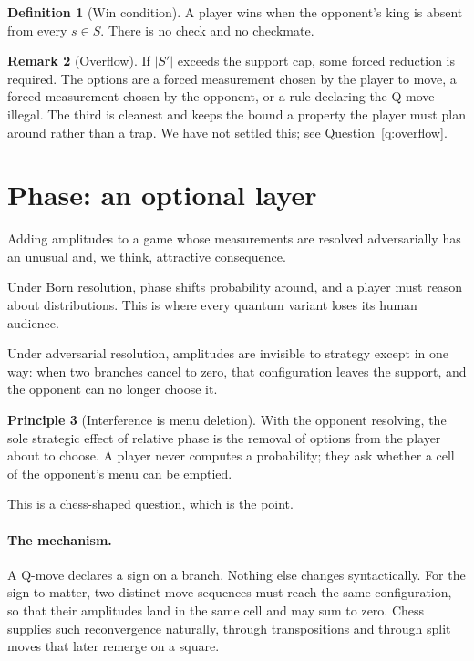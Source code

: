 \documentclass[11pt,a4paper]{article}
\theoremstyle{definition}
\newtheorem{definition}{Definition}[section]
\newtheorem{principle}[definition]{Principle}
\newtheorem{remark}[definition]{Remark}
\theoremstyle{plain}
\begin{document}
\begin{definition}[Win condition]
A player wins when the opponent's king is absent from every $s\in S$. There is
no check and no checkmate.
\end{definition}

\begin{remark}[Overflow]
If $|S'|$ exceeds the support cap, some forced reduction is required. The
options are a forced measurement chosen by the player to move, a forced
measurement chosen by the opponent, or a rule declaring the Q-move illegal.
The third is cleanest and keeps the bound a property the player must plan
around rather than a trap. We have not settled this; see
Question~\ref{q:overflow}.
\end{remark}

\section{Phase: an optional layer}
\label{sec:phase}

Adding amplitudes to a game whose measurements are resolved adversarially has
an unusual and, we think, attractive consequence.

Under Born resolution, phase shifts probability around, and a player must
reason about distributions. This is where every quantum variant loses its human
audience.

Under adversarial resolution, amplitudes are invisible to strategy except in
one way: when two branches cancel to zero, that configuration leaves the
support, and the opponent can no longer choose it.

\begin{principle}[Interference is menu deletion]
\label{prin:menu}
With the opponent resolving, the sole strategic effect of relative phase is the
removal of options from the player about to choose. A player never computes a
probability; they ask whether a cell of the opponent's menu can be emptied.
\end{principle}

This is a chess-shaped question, which is the point.

\paragraph{The mechanism.}
A Q-move declares a sign on a branch. Nothing else changes syntactically. For
the sign to matter, two distinct move sequences must reach the same
configuration, so that their amplitudes land in the same cell and may sum to
zero. Chess supplies such reconvergence naturally, through transpositions and
through split moves that later remerge on a square.
\end{document}
